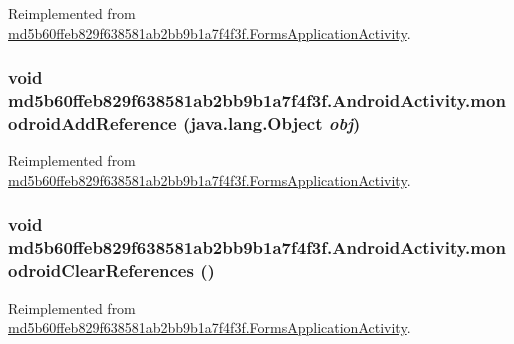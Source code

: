 Reimplemented from \hyperlink{classmd5b60ffeb829f638581ab2bb9b1a7f4f3f_1_1_forms_application_activity_7e80971fb4184461dc21b70a23a7e601}{md5b60ffeb829f638581ab2bb9b1a7f4f3f.FormsApplicationActivity}.\hypertarget{classmd5b60ffeb829f638581ab2bb9b1a7f4f3f_1_1_android_activity_6b88d0d1ad864a4599f8a26deaacb459}{
\subsubsection[{monodroidAddReference}]{\setlength{\rightskip}{0pt plus 5cm}void md5b60ffeb829f638581ab2bb9b1a7f4f3f.AndroidActivity.monodroidAddReference (java.lang.Object {\em obj})}}
\label{classmd5b60ffeb829f638581ab2bb9b1a7f4f3f_1_1_android_activity_6b88d0d1ad864a4599f8a26deaacb459}




Reimplemented from \hyperlink{classmd5b60ffeb829f638581ab2bb9b1a7f4f3f_1_1_forms_application_activity_2c4010f783599213a274f63e6d5fd3d3}{md5b60ffeb829f638581ab2bb9b1a7f4f3f.FormsApplicationActivity}.\hypertarget{classmd5b60ffeb829f638581ab2bb9b1a7f4f3f_1_1_android_activity_5b7d4be6ba547abcf4a46221f65a8eb6}{
\subsubsection[{monodroidClearReferences}]{\setlength{\rightskip}{0pt plus 5cm}void md5b60ffeb829f638581ab2bb9b1a7f4f3f.AndroidActivity.monodroidClearReferences ()}}
\label{classmd5b60ffeb829f638581ab2bb9b1a7f4f3f_1_1_android_activity_5b7d4be6ba547abcf4a46221f65a8eb6}




Reimplemented from \hyperlink{classmd5b60ffeb829f638581ab2bb9b1a7f4f3f_1_1_forms_application_activity_837c4f559a7030eedd33be67a0272eaf}{md5b60ffeb829f638581ab2bb9b1a7f4f3f.FormsApplicationActivity}.

